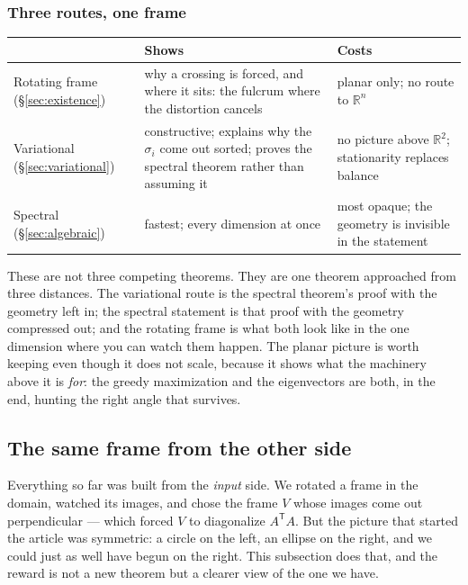 \documentclass[11pt]{article}
\numberwithin{equation}{section}
\newcommand{\R}{\mathbb{R}}
\newcommand{\T}{^{\mathsf{T}}}
\theoremstyle{plainish}
\begin{document}
\subsubsection*{Three routes, one frame}

\begin{center}
\begin{tabular}{@{}p{2.9cm}p{4.6cm}p{4.6cm}@{}}
\toprule
& \textbf{Shows} & \textbf{Costs} \\
\midrule
Rotating frame \newline (\S\ref{sec:existence})
  & why a crossing is forced, and where it sits: the fulcrum where the
    distortion cancels
  & planar only; no route to $\R^n$ \\[0.4em]
Variational \newline (\S\ref{sec:variational})
  & constructive; explains why the $\sigma_i$ come out sorted; proves the
    spectral theorem rather than assuming it
  & no picture above $\R^2$; stationarity replaces balance \\[0.4em]
Spectral \newline (\S\ref{sec:algebraic})
  & fastest; every dimension at once
  & most opaque; the geometry is invisible in the statement \\
\bottomrule
\end{tabular}
\end{center}

\noindent
These are not three competing theorems. They are one theorem approached from
three distances. The variational route is the spectral theorem's proof with the
geometry left in; the spectral statement is that proof with the geometry
compressed out; and the rotating frame is what both look like in the one
dimension where you can watch them happen. The planar picture is worth keeping
even though it does not scale, because it shows what the machinery above it is
\emph{for}: the greedy maximization and the eigenvectors are both, in the end,
hunting the right angle that survives.

\subsection{The same frame from the other side}
\label{sec:duality}

Everything so far was built from the \emph{input} side. We rotated a frame in
the domain, watched its images, and chose the frame $V$ whose images come out
perpendicular --- which forced $V$ to diagonalize $A\T A$. But the picture that
started the article was symmetric: a circle on the left, an ellipse on the
right, and we could just as well have begun on the right. This subsection does
that, and the reward is not a new theorem but a clearer view of the one we have.
\end{document}
